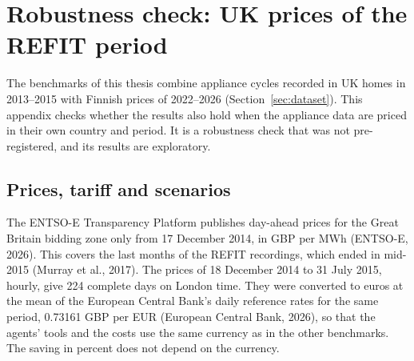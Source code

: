 %
%

\appendix
\renewcommand{\thechapter}{\Alph{chapter}}

\chapter{Robustness check: UK prices of the REFIT period}
\label{app:uk2015}

The benchmarks of this thesis combine appliance cycles recorded in UK
homes in 2013--2015 with Finnish prices of 2022--2026
(Section~\ref{sec:dataset}). This appendix checks whether the results
also hold when the appliance data are priced in their own country and
period. It is a robustness check that was not pre-registered, and its
results are exploratory.

\section{Prices, tariff and scenarios}

The ENTSO-E Transparency Platform publishes day-ahead prices for the
Great Britain bidding zone only from 17 December 2014, in GBP per MWh
(ENTSO-E, 2026). This covers the last months of the REFIT recordings,
which ended in mid-2015 (Murray et al., 2017). The prices of 18 December
2014 to 31 July 2015, hourly, give 224 complete days on London time.
They were converted to euros at the mean of the European Central Bank's
daily reference rates for the same period, 0.73161 GBP per EUR
(European Central Bank, 2026), so that the agents' tools and the costs
use the same currency as in the other benchmarks. The saving in percent
does not depend on the currency.

